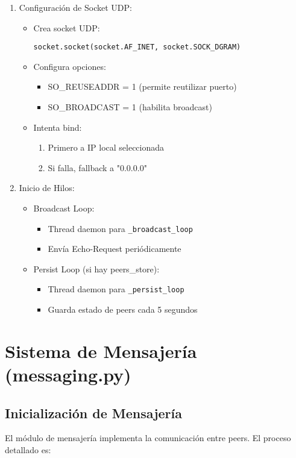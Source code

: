 \documentclass[12pt]{article}
\begin{document}
\begin{enumerate}
    \item Configuración de Socket UDP:
    \begin{itemize}
        \item Crea socket UDP:
        \begin{verbatim}
socket.socket(socket.AF_INET, socket.SOCK_DGRAM)
        \end{verbatim}
        \item Configura opciones:
        \begin{itemize}
            \item SO\_REUSEADDR = 1 (permite reutilizar puerto)
            \item SO\_BROADCAST = 1 (habilita broadcast)
        \end{itemize}
        \item Intenta bind:
        \begin{enumerate}
            \item Primero a IP local seleccionada
            \item Si falla, fallback a "0.0.0.0"
        \end{enumerate}
    \end{itemize}

    \item Inicio de Hilos:
    \begin{itemize}
        \item Broadcast Loop:
        \begin{itemize}
            \item Thread daemon para \texttt{\_broadcast\_loop}
            \item Envía Echo-Request periódicamente
        \end{itemize}
        \item Persist Loop (si hay peers\_store):
        \begin{itemize}
            \item Thread daemon para \texttt{\_persist\_loop}
            \item Guarda estado de peers cada 5 segundos
        \end{itemize}
    \end{itemize}
\end{enumerate}

\section{Sistema de Mensajería (messaging.py)}
\subsection{Inicialización de Mensajería}
El módulo de mensajería implementa la comunicación entre peers. El proceso detallado es:
\end{document}
